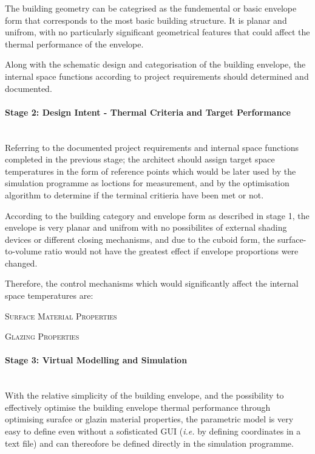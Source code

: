 The building geometry can be categrised as the fundemental or basic envelope form that corresponds to the most basic building structure. It is planar and unifrom, with no particularly significant geometrical features that could affect the thermal performance of the envelope.

Along with the schematic design and categorisation of the building envelope, the internal space functions according to project requirements should determined and documented.

\paragraph{Stage 2: Design Intent - Thermal Criteria and Target Performance}\mbox{}\\

Referring to the documented project requirements and internal space functions completed in the previous stage; the architect should assign target space temperatures in the form of reference points which would be later used by the simulation programme as loctions for measurement, and by the optimisation algorithm to determine if the terminal critieria have been met or not.

According to the building category and envelope form as described in stage 1, the envelope is very planar and unifrom with no possibilites of external shading devices or different closing mechanisms, and due to the cuboid form, the surface-to-volume ratio would not have the greatest effect if envelope proportions were changed.

Therefore, the control mechanisms which would significantly affect the internal space temperatures are:
\begin{compactenum}
	\item \textsc{Surface Material Properties}
	\item \textsc{Glazing Properties}
\end{compactenum}

\paragraph{Stage 3: Virtual Modelling and Simulation}\mbox{}\\

With the relative simplicity of the building envelope, and the possibility to effectively optimise the building envelope thermal performance through optimising surafce or glazin material properties, the parametric model is very easy to define even without a sofisticated GUI (\emph{i.e.} by defining coordinates in a text file) and can thereofore be defined directly in the simulation programme.

